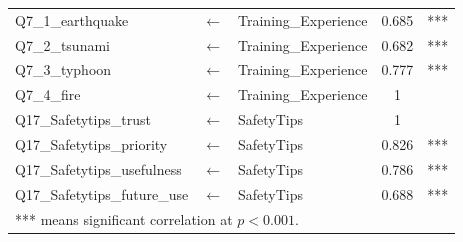 \begin{table}[h]
\begin{tabular}{lcl|c|c}
Q7\_1\_earthquake       &$\longleftarrow$ & Training\_Experience & 0.685  & ***                  \\
Q7\_2\_tsunami          &$\longleftarrow$ & Training\_Experience & 0.682  & ***                  \\
Q7\_3\_typhoon          &$\longleftarrow$ & Training\_Experience & 0.777  & ***                  \\
Q7\_4\_fire             &$\longleftarrow$ & Training\_Experience & 1      & \\
Q17\_Safetytips\_trust &$\longleftarrow$ & SafetyTips           & 1      &  \\
Q17\_Safetytips\_priority &$\longleftarrow$ & SafetyTips           & 0.826  & ***                  \\
Q17\_Safetytips\_usefulness &$\longleftarrow$ & SafetyTips           & 0.786  & ***                  \\
Q17\_Safetytips\_future\_use &$\longleftarrow$ & SafetyTips           & 0.688  & ***                 \\
 \hline
\multicolumn{5}{l}{*** means significant correlation at $p<0.001$.}
  \end{tabular}
\end{table}

